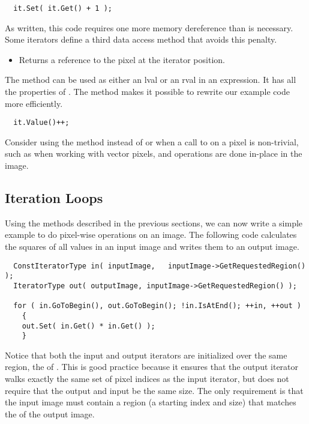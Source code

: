 \small
\begin{verbatim}
  it.Set( it.Get() + 1 );
\end{verbatim}
\normalsize

As written, this code requires one more memory dereference than is necessary.
Some iterators define a third data access method that avoids this penalty.

\begin{itemize}
\item \textbf{} Returns a reference to the pixel at
the iterator position.
\end{itemize}

The  method can be used as either an lval or an rval in an
expression.  It has all the properties of .  The
 method makes it possible to rewrite our example code more
efficiently.

\small
\begin{verbatim}
  it.Value()++;
\end{verbatim}
\normalsize

Consider using the  method instead of  or
 when a call to  on a pixel is non-trivial, such as
when working with vector pixels, and operations are done in-place in the
image.

\subsection{Iteration Loops}
\label{sec:IterationExample}
Using the methods described in the previous sections, we can now write a simple
example to do pixel-wise operations on an image.  The following code calculates
the squares of all values in an input image and writes them to an output image.

\small
\begin{verbatim}
  ConstIteratorType in( inputImage,   inputImage->GetRequestedRegion() );
  IteratorType out( outputImage, inputImage->GetRequestedRegion() );

  for ( in.GoToBegin(), out.GoToBegin(); !in.IsAtEnd(); ++in, ++out )
    {
    out.Set( in.Get() * in.Get() );
    }
\end{verbatim}
\normalsize

Notice that both the input and output iterators are initialized over the same
region, the  of .  This is good
practice because it ensures that the output iterator walks exactly the same set
of pixel indices as the input iterator, but does not require that the output
and input be the same size. The only requirement is that the input image
must contain a region (a starting index and size) that matches the
 of the output image.

